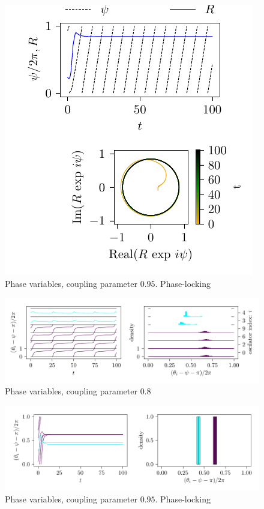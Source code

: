 \documentclass[twocolumn]{article}
\begin{document}
\begin{figure}
\centering
\includegraphics[scale=1]{orderParameter095}
\caption{Phase variables, coupling parameter $0.95$. Phase-locking}
\end{figure}

\blindtext[1]

\newpage

\blindtext[2]

\begin{figure}
\centering
\includegraphics[scale=1]{phaseVariables080}
\caption{Phase variables, coupling parameter $0.8$}
\end{figure}

\blindtext[2]

\begin{figure}
\centering
\includegraphics[scale=1]{phaseVariables095}
\caption{Phase variables, coupling parameter $0.95$. Phase-locking}
\end{figure}

\blindtext[10]




\end{document}
